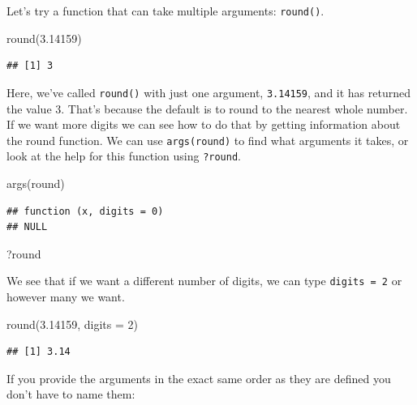 \documentclass[
]{book}
\newenvironment{Shaded}{\begin{snugshade}}{\end{snugshade}}
\newcommand{\AttributeTok}[1]{\textcolor[rgb]{0.77,0.63,0.00}{#1}}
\newcommand{\DecValTok}[1]{\textcolor[rgb]{0.00,0.00,0.81}{#1}}
\newcommand{\FloatTok}[1]{\textcolor[rgb]{0.00,0.00,0.81}{#1}}
\newcommand{\FunctionTok}[1]{\textcolor[rgb]{0.00,0.00,0.00}{#1}}
\newcommand{\NormalTok}[1]{#1}
\begin{document}
Let's try a function that can take multiple arguments: \texttt{round()}.

\begin{Shaded}
\begin{Highlighting}[]
\FunctionTok{round}\NormalTok{(}\FloatTok{3.14159}\NormalTok{)}
\end{Highlighting}
\end{Shaded}

\begin{verbatim}
## [1] 3
\end{verbatim}

Here, we've called \texttt{round()} with just one argument, \texttt{3.14159}, and it has returned the value 3. That's because the default is to round to the nearest whole number. If we want more digits we can see how to do that by getting information about the round function. We can use \texttt{args(round)} to find what arguments it takes, or look at the help for this function using \texttt{?round}.

\begin{Shaded}
\begin{Highlighting}[]
\FunctionTok{args}\NormalTok{(round)}
\end{Highlighting}
\end{Shaded}

\begin{verbatim}
## function (x, digits = 0) 
## NULL
\end{verbatim}

\begin{Shaded}
\begin{Highlighting}[]
\NormalTok{?round}
\end{Highlighting}
\end{Shaded}

We see that if we want a different number of digits, we can type \texttt{digits\ =\ 2} or however many we want.

\begin{Shaded}
\begin{Highlighting}[]
\FunctionTok{round}\NormalTok{(}\FloatTok{3.14159}\NormalTok{, }\AttributeTok{digits =} \DecValTok{2}\NormalTok{)}
\end{Highlighting}
\end{Shaded}

\begin{verbatim}
## [1] 3.14
\end{verbatim}

If you provide the arguments in the exact same order as they are defined you don't have to name them:
\end{document}
